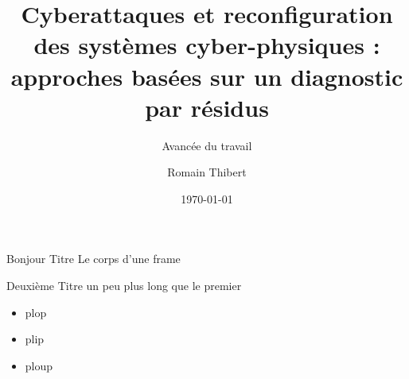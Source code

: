 \documentclass[aspectratio=169]{beamer}
\title{Cyberattaques et reconfiguration des systèmes cyber-physiques : approches basées sur un diagnostic par résidus}
\subtitle{Avancée du travail}
\author[R. Thibert]{Romain Thibert}
\date[2022]{\today}
\begin{document}
\frame{\titlepage}

\begin{frame}{Bonjour Titre}
Le corps d'une frame
\end{frame}

\begin{frame}{Deuxième Titre un peu plus long que le premier}
\begin{itemize}
    \item plop
    \pause
    \item plip
    \pause
    \item ploup
\end{itemize}
\end{frame}
\end{document}
